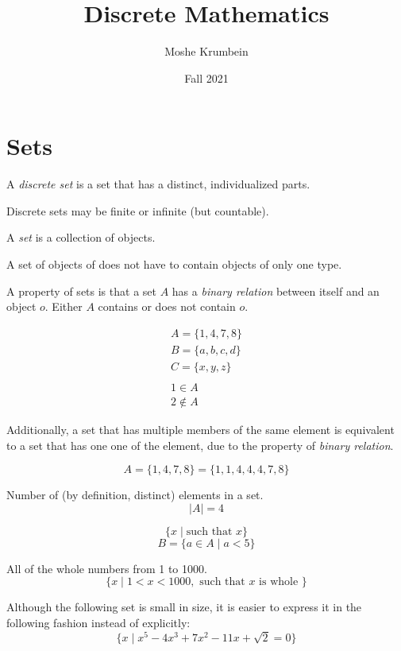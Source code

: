 \documentclass[00_complete]{subfiles}
\title{Discrete Mathematics}
\author{Moshe Krumbein}
\date{Fall 2021}
\begin{document}

\section{Sets}
\begin{definition}
A \emph{discrete set} is a set that has a distinct, individualized parts.

Discrete sets may be finite or infinite (but countable).
\end{definition}

\begin{definition}[Sets]
A \emph{set} is a collection of objects.

A set of objects of does not have to contain objects of only one type.

A property of sets is that a set $A$ has a \emph{binary relation} between
itself and an object $o$. Either $A$ contains or does not contain $o$.
\end{definition}

\begin{example}
$$
\begin{gathered}
    A=\{1,4,7,8\} \\
    B=\{a,b,c,d\} \\
    C=\{x,y,z\} \\
    \\
    1 \in A \\
    2 \notin A
\end{gathered}
$$
\end{example}

Additionally, a set that has multiple members of the same element is
equivalent to a set that has one one of the element, due to the property of
\emph{binary relation}.

$$A = \{1,4,7,8\} = \{1,1,4,4,4,7,8\}$$

\begin{definition}
    Number of (by definition, distinct) elements in a set.
    $$|A| = 4$$
\end{definition}

\begin{definition}
$$\{ x \;|\; \text{such that } x \}$$
$$B = \{a \in A \;|\; a < 5 \}$$
\begin{example}
All of the whole numbers from 1 to 1000.
$$\{x \;|\; 1<x<1000, \text{ such that $x$ is whole }\}$$
\end{example}

Although the following set is small in size, it is easier to express it in
the following fashion instead of explicitly:
$$\{x \;|\; x^5-4x^3+7x^2-11x+\sqrt 2=0\}$$
\end{definition}
\end{document}
